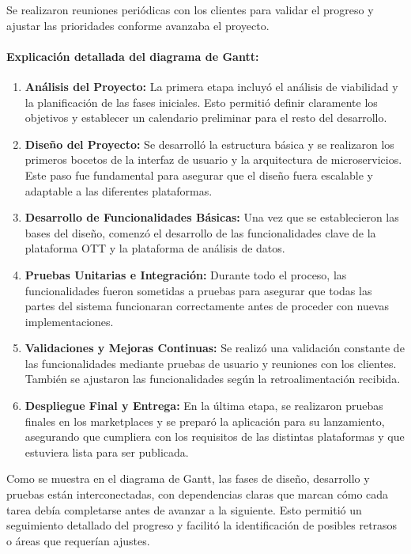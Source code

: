 Se realizaron reuniones periódicas con los clientes para validar el progreso y ajustar las prioridades conforme avanzaba el proyecto.

\paragraph{Explicación detallada del diagrama de Gantt:}

\begin{enumerate}
    \item \textbf{Análisis del Proyecto:} La primera etapa incluyó el análisis de viabilidad y la planificación de las fases iniciales. 
    Esto permitió definir claramente los objetivos y establecer un calendario preliminar para el resto del desarrollo.
   
    \item \textbf{Diseño del Proyecto:} Se desarrolló la estructura básica y se realizaron los primeros bocetos de la 
    interfaz de usuario y la arquitectura de microservicios. Este paso fue fundamental para asegurar que el diseño fuera 
    escalable y adaptable a las diferentes plataformas.

    \item \textbf{Desarrollo de Funcionalidades Básicas:} Una vez que se establecieron las bases del diseño, comenzó el desarrollo 
    de las funcionalidades clave de la plataforma OTT y la plataforma de análisis de datos.

    \item \textbf{Pruebas Unitarias e Integración:} Durante todo el proceso, las funcionalidades fueron sometidas a pruebas para 
    asegurar que todas las partes del sistema funcionaran correctamente antes de proceder con nuevas implementaciones.

    \item \textbf{Validaciones y Mejoras Continuas:} Se realizó una validación constante de las funcionalidades mediante pruebas 
    de usuario y reuniones con los clientes. También se ajustaron las funcionalidades según la retroalimentación recibida.

    \item \textbf{Despliegue Final y Entrega:} En la última etapa, se realizaron pruebas finales en los marketplaces y se preparó 
    la aplicación para su lanzamiento, asegurando que cumpliera con los requisitos de las distintas plataformas y que estuviera 
    lista para ser publicada.
\end{enumerate}

Como se muestra en el diagrama de Gantt, las fases de diseño, desarrollo y pruebas están interconectadas, con dependencias claras 
que marcan cómo cada tarea debía completarse antes de avanzar a la siguiente. Esto permitió un seguimiento detallado del progreso 
y facilitó la identificación de posibles retrasos o áreas que requerían ajustes.

